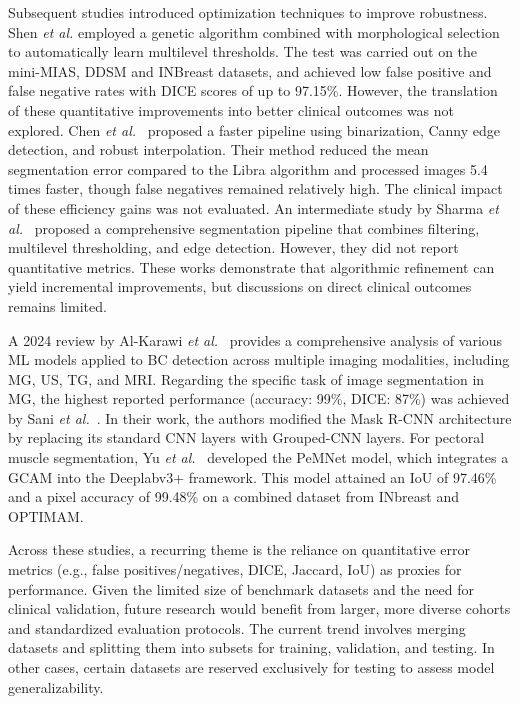 \documentclass[runningheads]{llncs}
\begin{document}
Subsequent studies introduced optimization techniques to improve
robustness. Shen \emph{et al.}\cite{Shen2018} employed a genetic
algorithm combined with morphological selection to automatically learn
multilevel thresholds. The test was carried out on the mini-\ac{MIAS},
DDSM and INBreast datasets, and achieved low false positive and false
negative rates with DICE scores of up to 97.15\%. However, the
translation of these quantitative improvements into better clinical
outcomes was not explored. Chen \emph{et al.}~\cite{Chen2024} proposed
a faster pipeline using binarization, Canny edge detection, and robust
interpolation. Their method reduced the mean segmentation error
compared to the Libra algorithm and processed images 5.4 times faster,
though false negatives remained relatively high. The clinical impact
of these efficiency gains was not evaluated. An intermediate study by
Sharma \emph{et al.}~\cite{Sharma2021} proposed a comprehensive
segmentation pipeline that combines filtering, multilevel
thresholding, and edge detection. However, they did not report
quantitative metrics. These works demonstrate that algorithmic
refinement can yield incremental improvements, but discussions on
direct clinical outcomes remains limited.

A 2024 review by Al-Karawi \emph{et al.}~\cite{AlKarawi2024} provides
a comprehensive analysis of various \ac{ML} models applied to \ac{BC}
detection across multiple imaging modalities, including \ac{MG},
\ac{US}, \ac{TG}, and \ac{MRI}. Regarding the specific task of image
segmentation in \ac{MG}, the highest reported performance (accuracy:
99\%, \ac{DICE}: 87\%) was achieved by Sani \emph{et
  al.}~\cite{Sani2023}. In their work, the authors modified the Mask
R-CNN architecture by replacing its standard \ac{CNN} layers with
Grouped-\ac{CNN} layers. For pectoral muscle segmentation, Yu \emph{et
  al.}~\cite{Yu2022} developed the PeMNet model, which integrates a
\ac{GCAM} into the Deeplabv3+ framework. This model attained an
\ac{IoU} of 97.46\% and a pixel accuracy of 99.48\% on a combined
dataset from INbreast and OPTIMAM.

Across these studies, a recurring theme is the reliance on
quantitative error metrics (e.g., false positives/negatives, DICE,
Jaccard, IoU) as proxies for performance. Given the limited size of
benchmark datasets and the need for clinical validation, future
research would benefit from larger, more diverse cohorts and
standardized evaluation protocols. The current trend involves merging
datasets and splitting them into subsets for training, validation, and
testing. In other cases, certain datasets are reserved exclusively for
testing to assess model generalizability.
\end{document}
